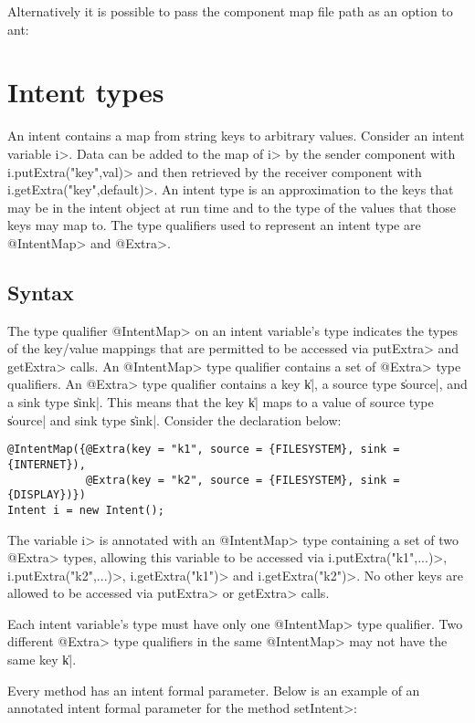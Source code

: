 \noindent
Alternatively it is possible to pass the component map file path as an option
to ant:


\section{Intent types\label{intent-types}}
An intent contains a map from string keys to arbitrary values. Consider an
intent variable \<i>. Data can be added to the map of \<i> by
the sender component with \<i.putExtra("key",val)> and then retrieved by the
receiver component with \<i.getExtra("key",default)>. An intent type is an
approximation to the keys that may be in the intent object at run time and to
the type of the values that those keys may map to. The type qualifiers used to
represent an intent type are \<@IntentMap> and \<@Extra>.

\subsection{Syntax}
The type qualifier \<@IntentMap> on an intent variable's type indicates the
types of the key/value mappings that are permitted to be accessed via
\<putExtra> and \<getExtra> calls.
An \<@IntentMap> type qualifier contains a set of \<@Extra> type qualifiers. An
\<@Extra> type qualifier contains a key \|k|, a source type \|source|, and a 
sink type \|sink|. This means that the key \|k| maps to a value of source type 
\|source| and sink type \|sink|. Consider the declaration below:

\begin{Verbatim}
@IntentMap({@Extra(key = "k1", source = {FILESYSTEM}, sink = {INTERNET}),
            @Extra(key = "k2", source = {FILESYSTEM}, sink = {DISPLAY})}) 
Intent i = new Intent();
\end{Verbatim}

The variable \<i> is annotated with an \<@IntentMap> type containing a set of
two \<@Extra> types, allowing this variable to be accessed via
\<i.putExtra("k1",...)>, \<i.putExtra("k2",...)>, \<i.getExtra("k1")> and
\<i.getExtra("k2")>. No other keys are allowed to be accessed via
\<putExtra> or \<getExtra> calls. 

Each intent variable's type must have only one \<@IntentMap> type qualifier. Two
different \<@Extra> type qualifiers in the same \<@IntentMap> may not have the
same key \|k|.

Every \onReceive{} method has an intent formal parameter.
Below is an example of an annotated intent formal parameter for the \onReceive{}
method \<setIntent>:

